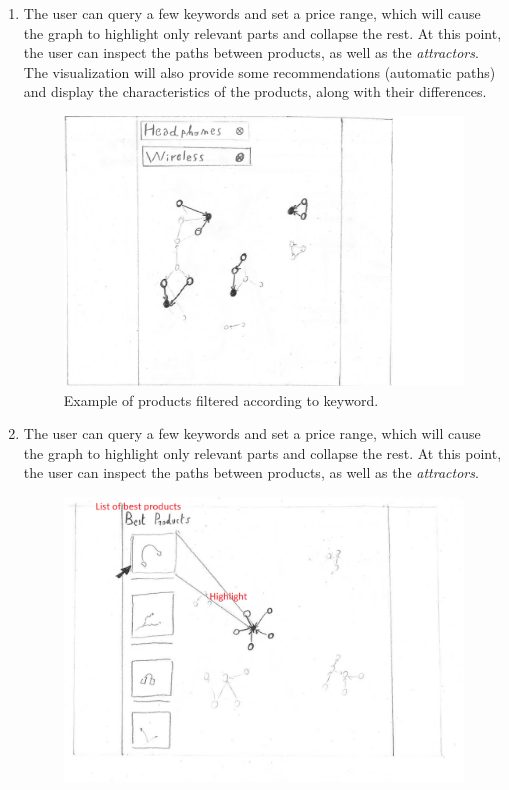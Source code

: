 \documentclass[a4paper,12pt]{article}
\begin{document}
\begin{enumerate}
\begin{figure}[H]
		\label{fig:graph}
	\end{figure}
	\item The user can query a few keywords and set a price range, which will cause the graph to highlight only relevant parts and collapse the rest. At this point, the user can inspect the paths between products, as well as the \emph{attractors}. The visualization will also provide some recommendations (automatic paths) and display the characteristics of the products, along with their differences.
		\begin{figure}[H]
		\centering{}
		\includegraphics[width=\textwidth]{img/wireless.png}
		\caption{Example of products filtered according to keyword.}
		\label{fig:wireless}
	\end{figure}
	\item The user can query a few keywords and set a price range, which will cause the graph to highlight only relevant parts and collapse the rest. At this point, the user can inspect the paths between products, as well as the \emph{attractors}. 
	\begin{figure}[H]
	\centering{}
	\includegraphics[width=\textwidth]{img/best.png}

\end{figure}
\end{enumerate}
\end{document}
